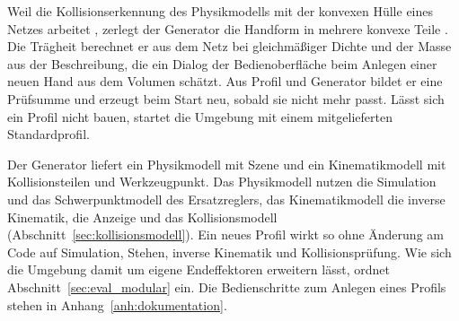 Weil die Kollisionserkennung des Physikmodells mit der konvexen Hülle eines Netzes arbeitet \cite{MujocoDoku2026a}, zerlegt der Generator die Handform in mehrere konvexe Teile .
Die Trägheit berechnet er aus dem Netz bei gleichmäßiger Dichte und der Masse aus der Beschreibung, die ein Dialog der Bedienoberfläche beim Anlegen einer neuen Hand aus dem Volumen schätzt.
Aus Profil und Generator bildet er eine Prüfsumme und erzeugt beim Start neu, sobald sie nicht mehr passt. Lässt sich ein Profil nicht bauen, startet die Umgebung mit einem mitgelieferten Standardprofil.

Der Generator liefert ein Physikmodell mit Szene und ein Kinematikmodell mit Kollisionsteilen und Werkzeugpunkt.
Das Physikmodell nutzen die Simulation und das Schwerpunktmodell des Ersatzreglers, das Kinematikmodell die inverse Kinematik, die Anzeige und das Kollisionsmodell (Abschnitt~\ref{sec:kollisionsmodell}).
Ein neues Profil wirkt so ohne Änderung am Code auf Simulation, Stehen, inverse Kinematik und Kollisionsprüfung.
Wie sich die Umgebung damit um eigene Endeffektoren erweitern lässt, ordnet Abschnitt~\ref{sec:eval_modular} ein.
Die Bedienschritte zum Anlegen eines Profils stehen in Anhang~\ref{anh:dokumentation}.
